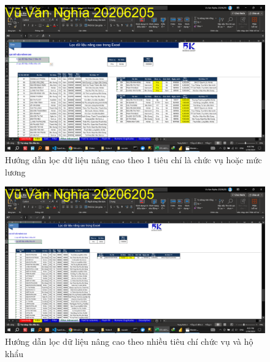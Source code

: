 \documentclass{article}
\begin{document}
\begin{figure}[h]
    \centering
    \includegraphics[scale = 0.15]{Video1/HuongDan/6.png}
    \caption{Hướng dẫn lọc dữ liệu nâng cao theo 1 tiêu chí là chức vụ hoặc mức lương}
\end{figure}
\begin{figure}[h]
    \centering
    \includegraphics[scale = 0.15]{Video1/HuongDan/7.png}
    \caption{Hướng dẫn lọc dữ liệu nâng cao theo  nhiều tiêu chí  chức vụ và hộ khẩu}
\end{figure}
\end{document}
